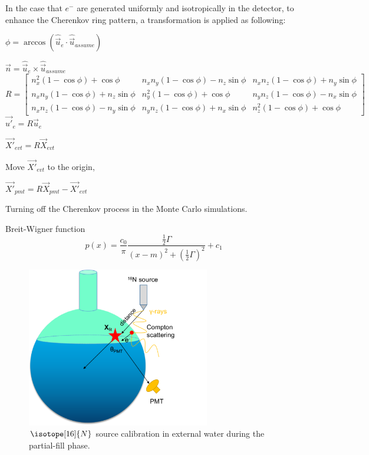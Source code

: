 In the case that $e^-$ are generated uniformly and isotropically in the detector, to enhance the 
Cherenkov ring pattern, a transformation is applied as following:

$\phi=\arccos(\hat{\vec{u}}_e\cdot\hat{\vec{u}}_{assume})$

$\vec{n}=\hat{\vec{u}}_e\times\hat{\vec{u}}_{assume}$
\[
R=\begin{bmatrix}
n^2_x(1-\cos\phi)+\cos\phi       &n_xn_y(1-\cos\phi)-n_z\sin\phi & n_xn_z(1-\cos\phi)+n_y\sin\phi \\
n_xn_y(1-\cos\phi)+n_z\sin\phi & n^2_y(1-\cos\phi)+\cos\phi & n_yn_z(1-\cos\phi)-n_x\sin\phi \\
n_xn_z(1-\cos\phi)-n_y\sin\phi & n_yn_z(1-\cos\phi)+n_x\sin\phi & n^2_z(1-\cos\phi)+\cos\phi
\end{bmatrix}
\]
$\vec{u'}_e=R\vec{u}_e$

$\vec{X'}_{evt}=R\vec{X}_{evt}$

Move $\vec{X'}_{evt}$ to the origin,

$\vec{X'}_{pmt}=R\vec{X}_{pmt}-\vec{X'}_{evt}$



Turning off the Cherenkov process in the Monte Carlo simulations.






Breit-Wigner function
\[
p(x) = \frac{c_0}{\pi}\frac{\frac{1}{2} \Gamma}{(x-m)^2 + (\frac{1}{2} \Gamma)^2}+c_1
\]





\begin{figure}[!htb]
	\centering
	\includegraphics[width=8cm]{partialN16.png}
	\caption{$\isotope[16]{N}$ source calibration in external water during the partial-fill phase.}
	\label{partialN16}
\end{figure}




